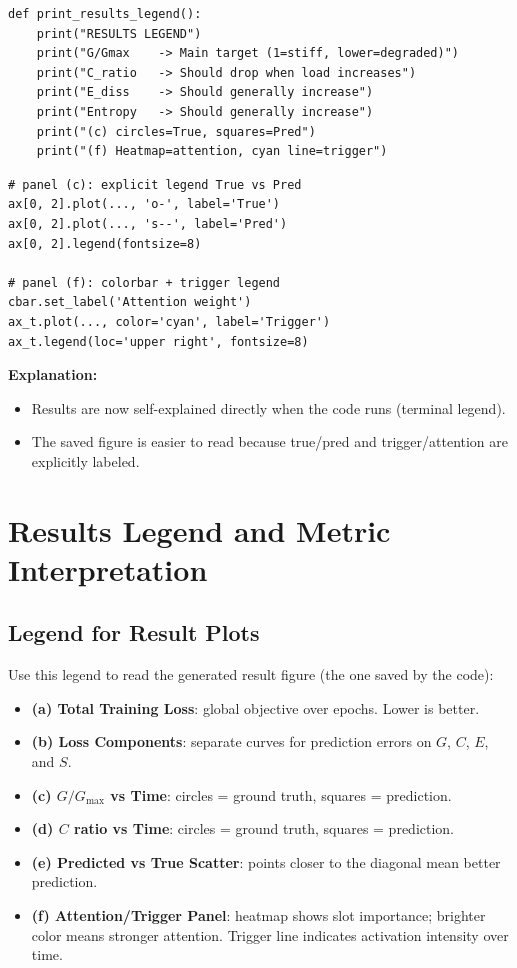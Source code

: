 \documentclass[12pt,a4paper]{article}
\begin{document}
\begin{lstlisting}[caption=Terminal legend printed at runtime]
def print_results_legend():
    print("RESULTS LEGEND")
    print("G/Gmax    -> Main target (1=stiff, lower=degraded)")
    print("C_ratio   -> Should drop when load increases")
    print("E_diss    -> Should generally increase")
    print("Entropy   -> Should generally increase")
    print("(c) circles=True, squares=Pred")
    print("(f) Heatmap=attention, cyan line=trigger")
\end{lstlisting}

\begin{lstlisting}[caption=Graph legends added in visualization]
# panel (c): explicit legend True vs Pred
ax[0, 2].plot(..., 'o-', label='True')
ax[0, 2].plot(..., 's--', label='Pred')
ax[0, 2].legend(fontsize=8)

# panel (f): colorbar + trigger legend
cbar.set_label('Attention weight')
ax_t.plot(..., color='cyan', label='Trigger')
ax_t.legend(loc='upper right', fontsize=8)
\end{lstlisting}

\textbf{Explanation:}
\begin{itemize}
  \item Results are now self-explained directly when the code runs (terminal legend).
  \item The saved figure is easier to read because true/pred and trigger/attention are explicitly labeled.
\end{itemize}

\section{Results Legend and Metric Interpretation}

\subsection{Legend for Result Plots}

Use this legend to read the generated result figure (the one saved by the code):
\begin{itemize}
  \item \textbf{(a) Total Training Loss}: global objective over epochs. Lower is better.
  \item \textbf{(b) Loss Components}: separate curves for prediction errors on $G$, $C$, $E$, and $S$.
  \item \textbf{(c) $G/G_{\max}$ vs Time}: circles = ground truth, squares = prediction.
  \item \textbf{(d) $C$ ratio vs Time}: circles = ground truth, squares = prediction.
  \item \textbf{(e) Predicted vs True Scatter}: points closer to the diagonal mean better prediction.
  \item \textbf{(f) Attention/Trigger Panel}: heatmap shows slot importance; brighter color means stronger attention. Trigger line indicates activation intensity over time.
\end{itemize}
\end{document}
